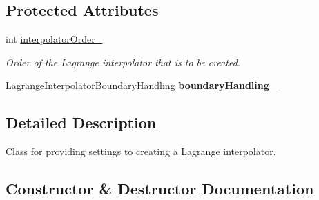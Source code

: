 \subsection*{Protected Attributes}
\begin{DoxyCompactItemize}
\item 
int \hyperlink{classtudat_1_1interpolators_1_1LagrangeInterpolatorSettings_a3af277eb4d3865932b4a44b3fd16be6b}{interpolator\+Order\+\_\+}\hypertarget{classtudat_1_1interpolators_1_1LagrangeInterpolatorSettings_a3af277eb4d3865932b4a44b3fd16be6b}{}\label{classtudat_1_1interpolators_1_1LagrangeInterpolatorSettings_a3af277eb4d3865932b4a44b3fd16be6b}

\begin{DoxyCompactList}\small\item\em Order of the Lagrange interpolator that is to be created. \end{DoxyCompactList}\item 
Lagrange\+Interpolator\+Boundary\+Handling {\bfseries boundary\+Handling\+\_\+}\hypertarget{classtudat_1_1interpolators_1_1LagrangeInterpolatorSettings_a46af6bfcf5cea6b6238a049e24fb42c7}{}\label{classtudat_1_1interpolators_1_1LagrangeInterpolatorSettings_a46af6bfcf5cea6b6238a049e24fb42c7}

\end{DoxyCompactItemize}


\subsection{Detailed Description}
Class for providing settings to creating a Lagrange interpolator. 

\subsection{Constructor \& Destructor Documentation}
